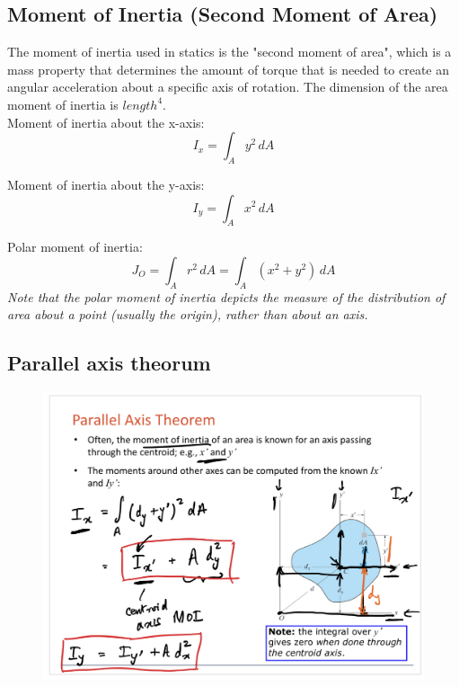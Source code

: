 \subsection{Moment of Inertia (Second Moment of Area)}

The moment of inertia used in statics is the "second moment of area", which is a mass property that determines the amount of torque that is needed to create an angular acceleration about a specific axis of rotation. The dimension of the area moment of inertia is $length^4$.\\

Moment of inertia about the x-axis:  \[I_x = \int_{A}^{} y^2 \,dA \]

Moment of inertia about the y-axis: \[I_y = \int_{A}^{} x^2 \,dA \]

Polar moment of inertia: \[J_O = \int_{A}^{} r^2 \,dA = \int_{A}^{} (x^2+y^2) \,dA\]
\textit{Note that the polar moment of inertia depicts the measure of the distribution of area about a point (usually the origin), rather than about an axis.}

\subsection{Parallel axis theorum}


\begin{figure}[!h]
\centering
\includegraphics[angle=0, width=\textwidth]{MOIFigures/ParallelAxisThm.png}
\vspace{-2mm}
\caption{\small {}}
\vspace{-3mm}
\label{Fig:ParallelAxisThm}
\end{figure}



